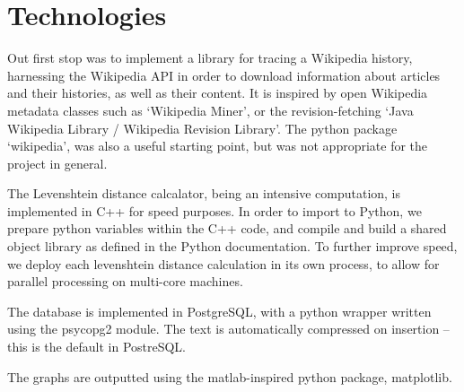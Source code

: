 \section{Technologies}
Out first stop was to implement a library for tracing a Wikipedia
history, harnessing the Wikipedia API in order to download information
about articles and their histories, as well as their content. It is
inspired by open Wikipedia metadata classes such as `Wikipedia
Miner'\cite{wiki-miner}, or the revision-fetching `Java Wikipedia
Library / Wikipedia Revision
Library'.\cite{wiki-java}\cite{Ferschke2011} The python package
`wikipedia',\cite{python-wikipedia} was also a useful starting point,
but was not appropriate for the project in general.

The Levenshtein distance calcalator, being an intensive computation,
is implemented in C++ for speed purposes. In order to import to
Python, we prepare python variables within the C++ code, and compile
and build a shared object library as defined in the Python
documentation.\cite{python-extend-c++} To further improve speed, we
deploy each levenshtein distance calculation in its own process, to
allow for parallel processing on multi-core machines.

The database is implemented in PostgreSQL, with a python wrapper
written using the psycopg2 module.\cite{psycopg2} The text is
automatically compressed on insertion -- this is the default in
PostreSQL.\cite{psql-comp} 

The graphs are outputted using the matlab-inspired python package,
matplotlib.\cite{matplotlib} 
